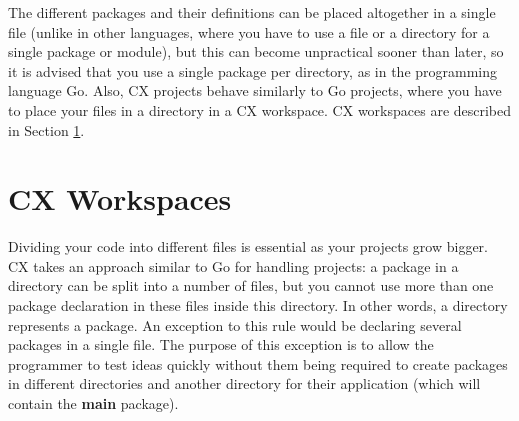 \documentclass[11pt,fleqn,openany]{book} %
\begin{document}
The different packages and their definitions can be placed altogether in a single file (unlike in other languages, where you have to use a file or a directory for a single package or module), but this can become unpractical sooner than later, so it is advised that you use a single package per directory, as in the programming language Go. Also, CX projects behave similarly to Go projects, where you have to place your files in a directory in a CX workspace. CX workspaces are described in Section \ref{section:cx-workspaces}.

\section{CX Workspaces}
\label{section:cx-workspaces}


Dividing your code into different files is essential as your projects grow bigger. CX takes an approach similar to Go for handling projects: a package in a directory can be split into a number of files, but you cannot use more than one package declaration in these files inside this directory. In other words, a directory represents a package. An exception to this rule would be declaring several packages in a single file. The purpose of this exception is to allow the programmer to test ideas quickly without them being required to create packages in different directories and another directory for their application (which will contain the \textbf{main} package).
\end{document}
